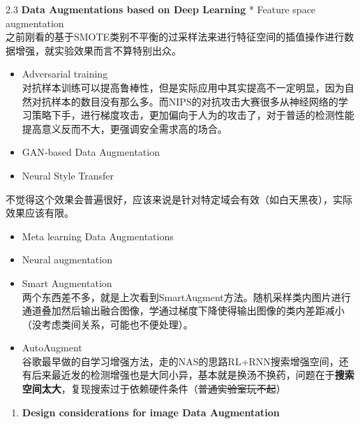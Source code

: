 2.3 \textbf{Data Augmentations based on Deep Learning} * Feature space
augmentation\\
之前刚看的基于SMOTE类别不平衡的过采样法来进行特征空间的插值操作进行数据增强，就实验效果而言不算特别出众。

\begin{itemize}
\item
  Adversarial training\\
  对抗样本训练可以提高鲁棒性，但是实际应用中其实提高不一定明显，因为自然对抗样本的数目没有那么多。而NIPS的对抗攻击大赛很多从神经网络的学习策略下手，进行梯度攻击，更加偏向于人为的攻击了，对于普适的检测性能提高意义反而不大，更强调安全需求高的场合。
\item
  GAN‑based Data Augmentation
\item
  Neural Style Transfer
\end{itemize}

不觉得这个效果会普遍很好，应该来说是针对特定域会有效（如白天黑夜），实际效果应该有限。

\begin{itemize}
\item
  Meta learning Data Augmentations
\item
  Neural augmentation
\item
  Smart Augmentation\\
  两个东西差不多，就是上次看到SmartAugment方法。随机采样类内图片进行通道叠加然后输出融合图像，学通过梯度下降使得输出图像的类内差距减小（没考虑类间关系，可能也不便处理）。
\end{itemize}

\begin{figure}
\centering
\caption{}
\end{figure}

\begin{itemize}
\item
  AutoAugment\\
  谷歌最早做的自学习增强方法，走的NAS的思路RL+RNN搜索增强空间，还有后来最近发的检测增强也是大同小异，基本就是换汤不换药，问题在于\textbf{搜索空间太大}，复现搜索过于依赖硬件条件（\sout{普通实验室玩不起}）
\end{itemize}

\begin{enumerate}
\def\labelenumi{\arabic{enumi}.}
\setcounter{enumi}{2}
\item
  \textbf{Design considerations for image Data Augmentation}
\end{enumerate}

